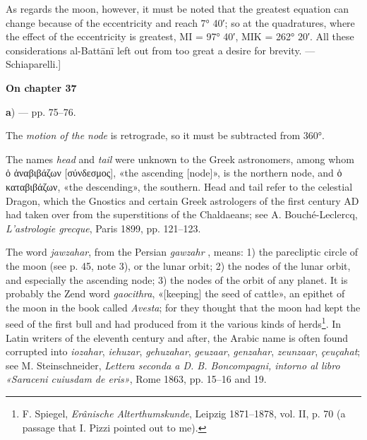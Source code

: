 \documentclass[11pt]{article}
\newcommand{\UnitHead}[2]{\par\setcounter{footnoteT}{0}\needspace{8\baselineskip}\bigskip\pdfbookmark[1]{#1}{unit-#2}\hypertarget{EN-#2}{}%
 {\large\bfseries\interlinepenalty=10000 #1\par}\nobreak\medskip}
\begin{document}
\par As regards the moon, however, it must be noted that the greatest equation can change because of the eccentricity and reach 7° 40′; so at the quadratures, where the effect of the eccentricity is greatest, MI = 97° 40′, MIK = 262° 20′. All these considerations al-Battānī left out from too great a desire for brevity. — Schiaparelli.]\par
\UnitHead{On chapter 37}{A37}
\par\begin{center}\textbf{a}) — pp. 75–76.\end{center}
\par The \emph{motion of the node} is retrograde, so it must be subtracted from 360°.\par
\par The names \emph{head} and \emph{tail} were unknown to the Greek astronomers, among whom {\greekfont ὁ ἀναβιβάζων} [{\greekfont σύνδεσμος}], «the ascending [node]», is the northern node, and {\greekfont ὁ καταβιβάζων}, «the descending», the southern. Head and tail refer to the celestial Dragon, which the Gnostics and certain Greek astrologers of the first century AD had taken over from the superstitions of the Chaldaeans; see A. Bouché-Leclercq, \emph{L’astrologie grecque}, Paris 1899, pp. 121–123.\par
\par The word \emph{jawzahar}, from the Persian \emph{gawzahr} , means: 1) the parecliptic circle of the moon (see p. 45, note 3), or the lunar orbit; 2) the nodes of the lunar orbit, and especially the ascending node; 3) the nodes of the orbit of any planet. It is probably the Zend word \emph{gaocithra}, «[keeping] the seed of cattle», an epithet of the moon in the book called \emph{Avesta}; for they thought that the moon had kept the seed of the first bull and had produced from it the various kinds of herds\footnote{F. Spiegel, \emph{Erânische Alterthumskunde}, Leipzig 1871–1878, vol. II, p. 70 (a passage that I. Pizzi pointed out to me).}. In Latin writers of the eleventh century and after, the Arabic name is often found corrupted into \emph{iozahar}, \emph{iehuzar}, \emph{gehuzahar}, \emph{geuzaar}, \emph{genzahar}, \emph{zeunzaar}, \emph{çeuçahat}; see M. Steinschneider, \emph{Lettera seconda a D. B. Boncompagni, intorno al libro «Saraceni cuiusdam de eris»}, Rome 1863, pp. 15–16 and 19.\par
\end{document}
